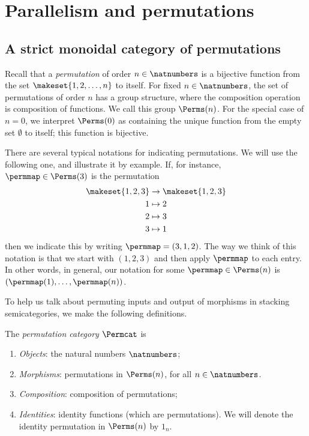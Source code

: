 
\section{Parallelism and permutations}
\label{sec:parallelism-and-permutations}


\subsection{A strict monoidal category of permutations}

Recall that a \emph{permutation} of order $n \in \natnumbers$ is a bijective function from the set $\makeset{1,2, \dots , n}$ to itself.
For fixed $n \in \natnumbers$, the set of permutations of order $n$ has a group structure, where the composition operation is composition of functions.
We call this group $\Perms(n)$.
For the special case of $n = 0$, we interpret $\Perms(0)$ as containing the unique function from the empty set $\emptyset$ to itself; this function is bijective.

There are several typical notations for indicating permutations.
We will use the following one, and illustrate it by example.
If, for instance, $\permmap \in \Perms(3)$ is the permutation
\begin{align*}
    \makeset{1,2,3} & \to \makeset{1,2,3} \\
    1               & \mapsto 2 \\
    2               & \mapsto 3 \\
    3               & \mapsto 1
\end{align*}
then we indicate this by writing $\permmap = (3, 1, 2)$.
The way we think of this notation is that we start with $(1, 2, 3)$ and then apply $\permmap$ to each entry.
In other words, in general, our notation for some $\permmap \in \Perms(n)$ is $(\permmap(1), \dots, \permmap(n))$.

To help us talk about permuting inputs and output of morphisms in stacking semicategories, we make the following definitions.

\begin{definition}\label{def:Permcat}
    The \emph{permutation category} $\Permcat$ is
    \begin{enumerate}
        \item \emph{Objects}: the natural numbers $\natnumbers$;
        \item \emph{Morphisms}: permutations in $\Perms(n)$, for all $n \in \natnumbers$.
        \item \emph{Composition}: composition of permutations;
        \item \emph{Identities}: identity functions (which are permutations).
              We will denote the identity permutation in $\Perms(n)$ by $1_n$.
    \end{enumerate}
\end{definition}

